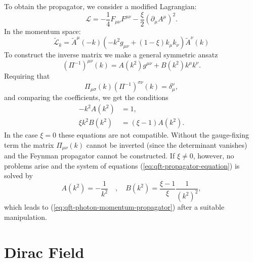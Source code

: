 To obtain the propagator, we consider a modified Lagrangian:
\begin{equation}
	\mathcal L = -\frac{1}{4}F_{\mu\nu}F^{\mu\nu}-\frac{\xi}{2}(\partial_\mu A^\mu)^2.
\end{equation}
In the momentum space:
\begin{equation}
	\tilde{\mathcal L}_k = \tilde{A}^\mu(-k)\left(-k^2 g_{\mu\nu}+(1-\xi)k_\mu k_\nu\right) \tilde{A}^\nu(k)
\end{equation}
To construct the inverse matrix we make a general symmetric ansatz
\begin{equation}
	(\Pi^{-1})^{\mu\nu}(k)=A\left(k^{2}\right) g^{\mu\nu}+B\left(k^{2}\right) k^{\mu} k^{\nu}.
\end{equation}
Requiring that
\begin{equation}
	\Pi_{\mu\sigma}(k)(\Pi^{-1})^{\sigma\nu}(k) = \delta_\mu^\nu,
\end{equation}
and comparing the coefficients, we get the conditions
\begin{equation}\label{eq:qft-propagator-equation}
\begin{aligned}
	-k^{2} A\left(k^{2}\right) &=1, \\
	\xi k^{2} B\left(k^{2}\right) &=(\xi-1) A\left(k^{2}\right).
\end{aligned}
\end{equation}
In the case $\xi=0$ these equations are not compatible. Without the gauge-fixing term the matrix $\Pi_{\mu \nu}(k)$ cannot be inverted (since the determinant vanishes) and the Feynman propagator cannot be constructed. If $\xi \neq 0$, however, no problems arise and the system of equations (\ref{eq:qft-propagator-equation}) is solved by
\begin{equation}
	A\left(k^{2}\right)=-\frac{1}{k^{2}} \quad, \quad B\left(k^{2}\right)=\frac{\xi-1}{\xi} \frac{1}{\left(k^{2}\right)^{2}},
\end{equation}
which leads to (\ref{eq:qft-photon-momentum-propagator}) after a suitable manipulation.



\section{Dirac Field}

